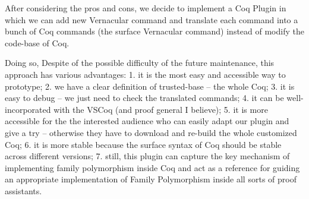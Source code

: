 After considering the pros and cons, we decide to implement a Coq Plugin in which we can add new Vernacular command and translate each command into a bunch of Coq commands (the surface Vernacular command) instead of modify the code-base of Coq. 

Doing so, Despite of the possible difficulty of the future maintenance, this approach has various advantages: 1. it is the most easy and accessible way to prototype; 2. we have a clear definition of trusted-base -- the whole Coq; 3. it is easy to debug -- we just need to check the translated commands; 4. it can be well-incorporated with the VSCoq (and proof general I believe); 5. it is more accessible for the the interested audience who can easily adapt our plugin and give a try -- otherwise they have to download and re-build the whole customized Coq; 6. it is more stable because the surface syntax of Coq should be stable across different versions; 7. still, this plugin can capture the key mechanism of implementing family polymorphism inside Coq and act as a reference for guiding an appropriate implementation of Family Polymorphism inside all sorts of proof assistants.